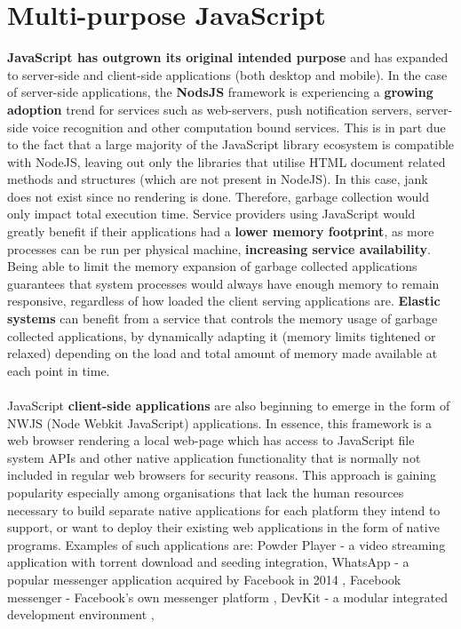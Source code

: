 \documentclass{l4proj}
\begin{document}
\section{Multi-purpose JavaScript}
\hspace*{1em} \textbf{JavaScript has outgrown its original intended purpose} and has expanded to server-side and client-side applications (both desktop and mobile). In the case of server-side applications, the \textbf{NodsJS} framework is experiencing a \textbf{growing adoption} trend for services such as web-servers, push notification servers, server-side voice recognition and other computation bound services. This is in part due to the fact that a large majority of the JavaScript library ecosystem is compatible with NodeJS, leaving out only the libraries that utilise HTML document related methods and structures (which are not present in NodeJS). In this case, jank does not exist since no rendering is done. Therefore, garbage collection would only impact total execution time. Service providers using JavaScript would greatly benefit if their applications had a \textbf{lower memory footprint}, as more processes can be run per physical machine, \textbf{increasing service availability}. Being able to limit the memory expansion of garbage collected applications guarantees that system processes would always have enough memory to remain responsive, regardless of how loaded the client serving applications are. \textbf{Elastic systems} can benefit from a service that controls the memory usage of garbage collected applications, by dynamically adapting it (memory limits tightened or relaxed) depending on the load and total amount of memory made available at each point in time.%
\\\\
\hspace*{1em} JavaScript \textbf{client-side applications} are also beginning to emerge in the form of NWJS (Node Webkit JavaScript) applications. In essence, this framework is a web browser rendering a local web-page which has access to JavaScript file system APIs and other native application functionality that is normally not included in regular web browsers for security reasons. This approach is gaining popularity especially among organisations that lack the human resources necessary to build separate native applications for each platform they intend to support, or want to deploy their existing web applications in the form of native programs. 
Examples of such applications are: Powder Player - a video streaming application with torrent download and seeding integration\cite{powderplayer}, WhatsApp - a popular messenger application acquired by Facebook in 2014 \cite{whatsap}, Facebook messenger - Facebook's own messenger platform \cite{messenger}, DevKit - a modular integrated development environment \cite{devkit},
\end{document}
